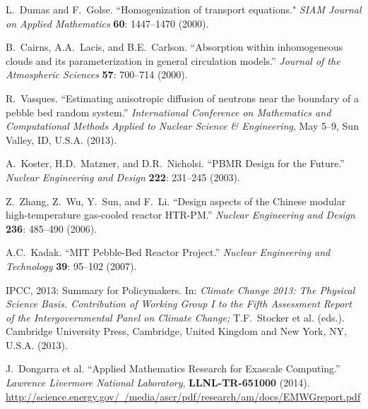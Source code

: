 \documentclass[12pt]{article}
\begin{document}
\begin{thebibliography}{10}
L.~Dumas and F.~Golse.
``Homogenization of transport equations."
\textit{SIAM Journal on Applied Mathematics} \textbf{60}: 1447--1470 (2000). \vspace{-5pt}

B.~Cairns, A.A.~Lacis, and B.E.~Carlson.
``Absorption within inhomogeneous clouds and its parameterization in general circulation models.''
\textit{Journal of the Atmospheric Sciences} \textbf{57}: 700--714 (2000).\vspace{-5pt}

R.~Vasques.
``Estimating anisotropic diffusion of neutrons near the boundary of a pebble bed random system.''
\textit{International Conference on Mathematics and Computational Methods Applied to Nuclear Science \& Engineering}, May 5--9, Sun Valley, ID, U.S.A. (2013).\vspace{-5pt}

A.~Koster, H.D.~Matzner, and D.R.~Nicholsi.
``PBMR Design for the Future.''
\textit{Nuclear Engineering and Design} \textbf{222}: 231--245 (2003).
\vspace{-5pt}

Z.~Zhang, Z.~Wu, Y.~Sun, and F.~Li.
``Design aspects of the Chinese modular high-temperature gas-cooled reactor HTR-PM.''
\textit{Nuclear Engineering and Design} \textbf{236}: 485--490 (2006).
\vspace{-5pt}

A.C.~Kadak.
``MIT Pebble-Bed Reactor Project.''
\textit{Nuclear Engineering and Technology} \textbf{39}: 95--102 (2007).
\vspace{-5pt}

IPCC, 2013: Summary for Policymakers.
In: \textit{Climate Change 2013: The Physical Science Basis. Contribution of
Working Group I to the Fifth Assessment Report of the Intergovernmental Panel on Climate Change;} T.F.~Stocker et al. (eds.).
Cambridge University Press, Cambridge, United Kingdom and New York, NY, U.S.A. (2013).
\vspace{-5pt}

J.~Dongarra et al.
``Applied Mathematics Research for Exascale Computing.''
\textit{Lawrence Livermore
National Laboratory}, \textbf{LLNL-TR-651000} (2014).\\
\href{http://science.energy.gov/~/media/ascr/pdf/research/am/docs/EMWGreport.pdf}{http://science.energy.gov/~/media/ascr/pdf/research/am/docs/EMWGreport.pdf}
\vspace{-5pt}


\end{thebibliography}
\end{document}
